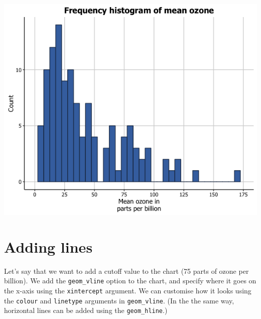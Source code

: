 \begin{center}\includegraphics[width=0.55\linewidth]{0_all_posts_pdf/histogram_16-1} \end{center}

\section{Adding lines}\label{adding-lines}

Let's say that we want to add a cutoff value to the chart (75 parts of
ozone per billion). We add the \texttt{geom\_vline} option to the chart,
and specify where it goes on the x-axis using the \texttt{xintercept}
argument. We can customise how it looks using the \texttt{colour} and
\texttt{linetype} arguments in \texttt{geom\_vline}. (In the the same
way, horizontal lines can be added using the \texttt{geom\_hline}.)

